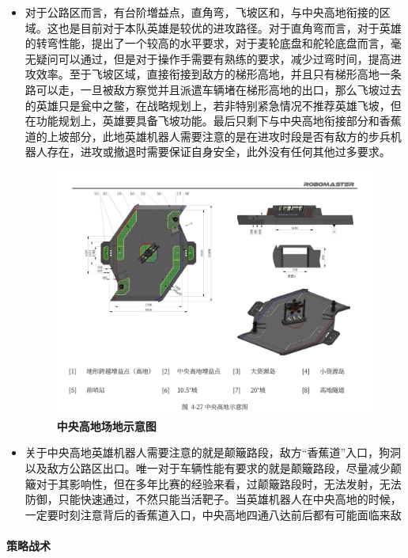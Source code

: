 \begin{itemize}
            \item 对于公路区而言，有台阶増益点，直角弯，飞坡区和，与中央高地衔接的区域。这也是目前对于本队英雄是较优的进攻路径。对于直角弯而言，对于英雄的转弯性能，提出了一个较高的水平要求，对于麦轮底盘和舵轮底盘而言，毫无疑问可以通过，但是对于操作手需要有熟练的要求，减少过弯时间，提高进攻效率。至于飞坡区域，直接衔接到敌方的梯形高地，并且只有梯形高地一条路可以走，一旦被敌方察觉并且派遣车辆堵在梯形高地的出口，那么飞坡过去的英雄只是瓮中之鳖，在战略规划上，若非特别紧急情况不推荐英雄飞坡，但在功能规划上，英雄要具备飞坡功能。最后只剩下与中央高地衔接部分和香蕉道的上坡部分，此地英雄机器人需要注意的是在进攻时段是否有敌方的步兵机器人存在，进攻或撤退时需要保证自身安全，此外没有任何其他过多要求。

            \begin{figure}[H]
                \centering
                \includegraphics[height=0.35\textwidth]{figure/centralTableland.png}
                \hspace{0.5em}
                \caption{\textbf{\textbf{中央高地场地示意图}}}
                \label{fig:centralTableland}
            \end{figure}

            \item 关于中央高地英雄机器人需要注意的就是颠簸路段，敌方“香蕉道”入口，狗洞以及敌方公路区出口。唯一对于车辆性能有要求的就是颠簸路段，尽量减少颠簸对于其影响性，但在多年比赛的经验来看，过颠簸路段时，无法发射，无法防御，只能快速通过，不然只能当活靶子。当英雄机器人在中央高地的时候，一定要时刻注意背后的香蕉道入口，中央高地四通八达前后都有可能面临来敌

        \end{itemize}

        
    
    \paragraph{策略战术}


